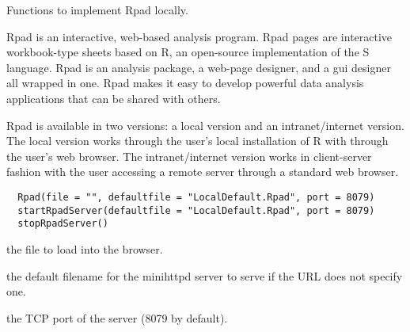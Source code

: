 \begin{Description}\relax
Functions to implement Rpad locally.

Rpad is an interactive, web-based analysis program. Rpad pages
are interactive workbook-type sheets based on R, an open-source
implementation of the S language. Rpad is an analysis package, a
web-page designer, and a gui designer all wrapped in one. Rpad
makes it easy to develop powerful data analysis applications that
can be shared with others.

Rpad is available in two versions: a local
version and an intranet/internet version. The local version works
through the user's local installation of R with through the user's web
browser. The intranet/internet
version works in client-server fashion with the user accessing a remote
server through a standard web browser.
\end{Description}
\begin{Usage}
\begin{verbatim}
  Rpad(file = "", defaultfile = "LocalDefault.Rpad", port = 8079)
  startRpadServer(defaultfile = "LocalDefault.Rpad", port = 8079)
  stopRpadServer()
\end{verbatim}
\end{Usage}
\begin{Arguments}
\begin{ldescription}
\item[\code{file}] the file to load into the browser. 
\item[\code{defaultfile}] the default filename for the minihttpd server to
serve if the URL does not specify one.
\item[\code{port}] the TCP port of the server (8079 by default).
\end{ldescription}
\end{Arguments}

